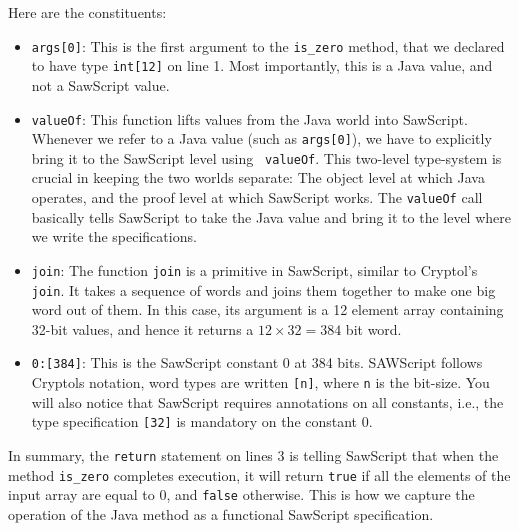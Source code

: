 \documentclass[12pt]{galois-whitepaper}
\newcommand{\sawScript}{{\sc SawScript}\xspace}
\begin{document}
Here are the constituents:
\begin{itemize}

\item {\tt args[0]}: This is the first argument to the {\tt is\_zero} method,
        that we declared to have type {\tt int[12]} on line 1. Most
        importantly, this is a Java value, and not a \sawScript value.

\item {\tt valueOf}: This function lifts values from the Java world into
        \sawScript.  Whenever we refer to a Java value (such as {\tt args[0]}),
        we have to explicitly bring it to the \sawScript level using {\tt
        valueOf}. This two-level type-system is crucial in keeping the two
        worlds separate: The object level at which Java operates, and the proof
        level at which \sawScript works. The {\tt valueOf} call basically tells
        \sawScript to take the Java value and bring it to the level where we
        write the specifications.

\item {\tt join}: The function {\tt join} is a primitive in \sawScript, similar
        to Cryptol's {\tt join}. It takes a sequence of words and joins them
        together to make one big word out of them. In this case, its argument
        is a 12 element array containing 32-bit values, and hence it returns a
        $12\times32 = 384$ bit word.  \item {\tt 0:[384]}: This is the
        \sawScript constant 0 at 384 bits.  SAWScript follows Cryptols
        notation, word types are written {\tt [n]}, where {\tt n} is the bit-size.
        You will also notice that
        \sawScript requires annotations on all constants, i.e., the type
        specification {\tt [32]} is mandatory on the constant $0$.

\end{itemize}

In summary, the {\tt return} statement on lines 3 is telling \sawScript that
when the method {\tt is\_zero} completes execution, it will return {\tt true}
if all the elements of the input array are equal to 0, and {\tt false}
otherwise. This is how we capture the operation of the Java method as a
functional \sawScript specification.
\end{document}

